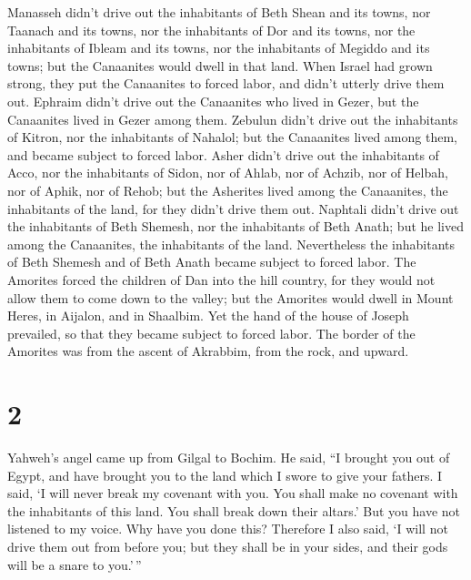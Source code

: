  Manasseh didn't drive out the inhabitants of Beth Shean
and its towns, nor Taanach and its towns, nor the inhabitants of Dor and
its towns, nor the inhabitants of Ibleam and its towns, nor the
inhabitants of Megiddo and its towns; but the Canaanites would dwell in
that land.  When Israel had grown strong, they put the
Canaanites to forced labor, and didn't utterly drive them out.
 Ephraim didn't drive out the Canaanites who lived in
Gezer, but the Canaanites lived in Gezer among them. 
Zebulun didn't drive out the inhabitants of Kitron, nor the inhabitants
of Nahalol; but the Canaanites lived among them, and became subject to
forced labor.  Asher didn't drive out the inhabitants of
Acco, nor the inhabitants of Sidon, nor of Ahlab, nor of Achzib, nor of
Helbah, nor of Aphik, nor of Rehob;  but the Asherites
lived among the Canaanites, the inhabitants of the land, for they didn't
drive them out.  Naphtali didn't drive out the
inhabitants of Beth Shemesh, nor the inhabitants of Beth Anath; but he
lived among the Canaanites, the inhabitants of the land. Nevertheless
the inhabitants of Beth Shemesh and of Beth Anath became subject to
forced labor.  The Amorites forced the children of Dan
into the hill country, for they would not allow them to come down to the
valley;  but the Amorites would dwell in Mount Heres, in
Aijalon, and in Shaalbim. Yet the hand of the house of Joseph prevailed,
so that they became subject to forced labor.  The border
of the Amorites was from the ascent of Akrabbim, from the rock, and
upward.

\hypertarget{section-1}{%
\section{2}\label{section-1}}

 Yahweh's angel came up from Gilgal to Bochim. He said,
``I brought you out of Egypt, and have brought you to the land which I
swore to give your fathers. I said, `I will never break my covenant with
you.  You shall make no covenant with the inhabitants of
this land. You shall break down their altars.' But you have not listened
to my voice. Why have you done this?  Therefore I also
said, `I will not drive them out from before you; but they shall be in
your sides, and their gods will be a snare to you.'\,''

